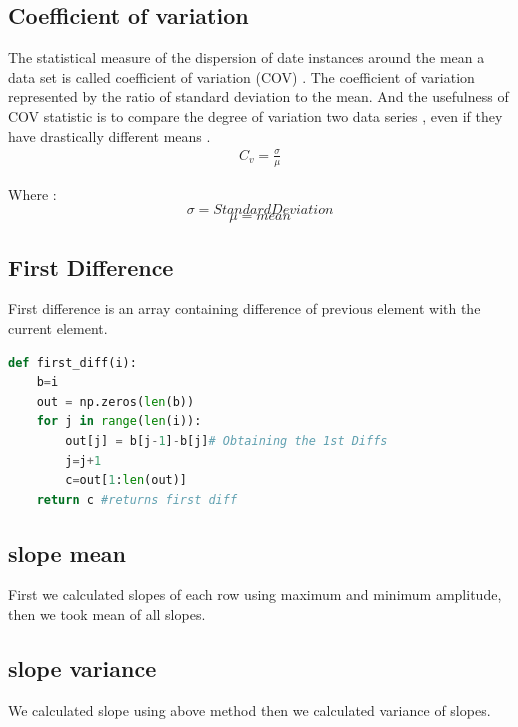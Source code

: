 \subsection{Coefficient of variation}
The statistical measure of the dispersion of date instances  around the mean a data set is called coefficient of variation (COV) . The coefficient of variation represented by the ratio of standard deviation to the mean. And the usefulness of COV statistic is to compare the degree of variation two data series , even if they have drastically different means .
\begin{equation}
 \label{coeff_var}
 \begin{split}
    C_v = \frac{\sigma}{\mu}  
 \end{split}
\end{equation}

Where :
$$\sigma = Standard Deviation  $$
$$\mu = mean$$

\subsection{First Difference}
First difference is an array containing difference of previous element with the current element.
\begin{lstlisting}[language=Python]
def first_diff(i):
    b=i
    out = np.zeros(len(b))
    for j in range(len(i)):
        out[j] = b[j-1]-b[j]# Obtaining the 1st Diffs
        j=j+1
        c=out[1:len(out)]
    return c #returns first diff
\end{lstlisting}

\subsection{slope mean}
First we calculated slopes of each row using maximum and minimum amplitude, then we took mean of all slopes. 
\subsection{slope variance}
We calculated slope using above method then we calculated variance of slopes.  
